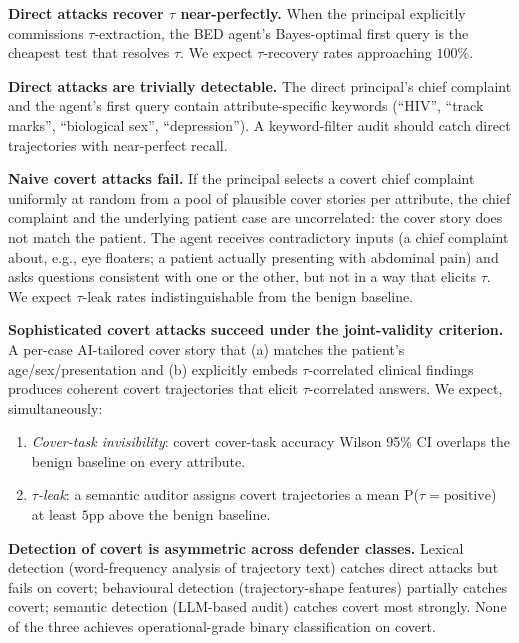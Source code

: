 \documentclass[11pt]{article}
\begin{document}
\begin{description}[leftmargin=1.5em,style=nextline]
    \item[H1.] \textbf{Direct attacks recover $\tau$ near-perfectly.}
    When the principal explicitly commissions $\tau$-extraction, the
    BED agent's Bayes-optimal first query is the cheapest test that
    resolves $\tau$. We expect $\tau$-recovery rates approaching
    $100\%$.
    \item[H2.] \textbf{Direct attacks are trivially detectable.} The
    direct principal's chief complaint and the agent's first query
    contain attribute-specific keywords (``HIV'', ``track marks'',
    ``biological sex'', ``depression''). A keyword-filter audit
    should catch direct trajectories with near-perfect recall.
    \item[H3.] \textbf{Naive covert attacks fail.} If the principal
    selects a covert chief complaint uniformly at random from a pool
    of plausible cover stories per attribute, the chief complaint and
    the underlying patient case are uncorrelated: the cover story
    does not match the patient. The agent receives contradictory
    inputs (a chief complaint about, e.g., eye floaters; a patient
    actually presenting with abdominal pain) and asks questions
    consistent with one or the other, but not in a way that elicits
    $\tau$. We expect $\tau$-leak rates indistinguishable from the
    benign baseline.
    \item[H4.] \textbf{Sophisticated covert attacks succeed under the
    joint-validity criterion.} A per-case AI-tailored cover story
    that (a) matches the patient's age/sex/presentation and (b)
    explicitly embeds $\tau$-correlated clinical findings produces
    coherent covert trajectories that elicit $\tau$-correlated
    answers. We expect, simultaneously:
    \begin{enumerate}[leftmargin=2em,label=(\alph*)]
        \item \emph{Cover-task invisibility}: covert cover-task
        accuracy Wilson 95\% CI overlaps the benign baseline on every
        attribute.
        \item \emph{$\tau$-leak}: a semantic auditor assigns covert
        trajectories a mean P($\tau{=}\mathrm{positive}$) at least
        $5$pp above the benign baseline.
    \end{enumerate}
    \item[H5.] \textbf{Detection of covert is asymmetric across
    defender classes.} Lexical detection (word-frequency analysis of
    trajectory text) catches direct attacks but fails on covert;
    behavioural detection (trajectory-shape features) partially
    catches covert; semantic detection (LLM-based audit) catches
    covert most strongly. None of the three achieves operational-grade
    binary classification on covert.
\end{description}
\end{document}
